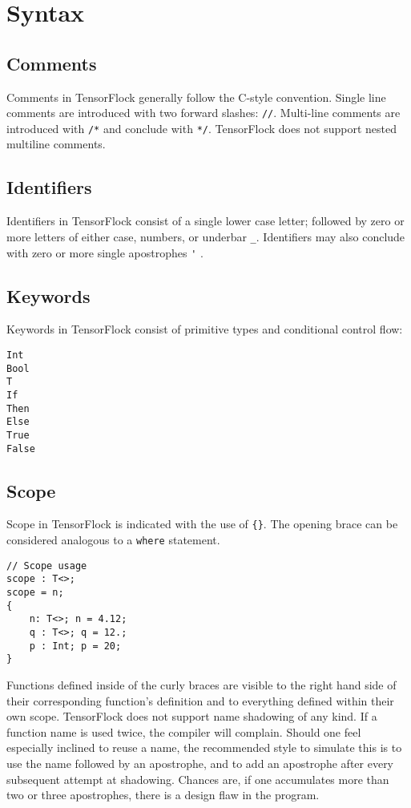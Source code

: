 \section{Syntax}%
\label{sec:syntax}
\subsection{Comments}
Comments in TensorFlock generally follow the C-style convention. Single line
comments are introduced with two forward slashes: \lstinline|//|. Multi-line
comments are introduced with \lstinline|/*| and conclude with \lstinline|*/|.
TensorFlock does not support nested multiline comments.
\subsection{Identifiers}
Identifiers in TensorFlock consist of a single lower case letter; followed by zero 
or more letters of either case, numbers, or underbar \lstinline|_|.
Identifiers may also conclude with zero or more single apostrophes \lstinline|'| .
\subsection{Keywords}
Keywords in TensorFlock consist of primitive types and conditional control flow:
\begin{lstlisting}
Int
Bool
T
If
Then
Else
True
False
\end{lstlisting}
\subsection{Scope}
Scope in TensorFlock is indicated with the use of \lstinline|{}|. The opening brace can be considered analogous to a \lstinline|where| statement.
\begin{lstlisting}
// Scope usage
scope : T<>;
scope = n; 
{ 
    n: T<>; n = 4.12;
    q : T<>; q = 12.; 
    p : Int; p = 20;
}
\end{lstlisting}
Functions defined inside of the curly braces are visible to the right hand
side of their corresponding function's definition and to everything defined
within their own scope. TensorFlock does not support name shadowing of any
kind. If a function name is used twice, the compiler will complain. Should one
feel especially inclined to reuse a name, the recommended style to simulate
this is to use the name followed by an apostrophe, and to add an apostrophe
after every subsequent attempt at shadowing. Chances are, if one accumulates
more than two or three apostrophes, there is a design flaw in the program.


